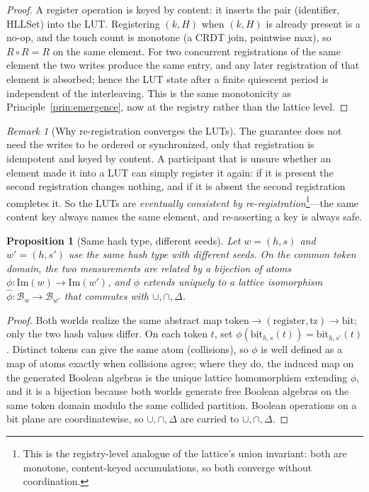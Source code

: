 \documentclass[11pt,a4paper]{article}
\newtheorem{proposition}[theorem]{Proposition}
\theoremstyle{remark}
\newtheorem{remark}[theorem]{Remark}
\newcommand{\Lat}{\ensuremath{\mathcal{B}}}         %
\newcommand{\Img}{\ensuremath{\mathrm{Im}}}         %
\begin{document}
\begin{proof}
A register operation is keyed by content: it inserts the pair (identifier,
HLLSet) into the LUT. Registering $(k,H)$ when $(k,H)$ is already present is a
no-op, and the touch count is monotone (a CRDT join, pointwise max), so
$R\circ R=R$ on the same element. For two concurrent registrations of the same
element the two writes produce the same entry, and any later registration of
that element is absorbed; hence the LUT state after a finite quiescent period is
independent of the interleaving. This is the same monotonicity as
Principle~\ref{prin:emergence}, now at the registry rather than the lattice
level.
\end{proof}

\begin{remark}[Why re-registration converges the LUTs]
The guarantee does not need the writes to be ordered or synchronized, only that
registration is idempotent and keyed by content. A participant that is unsure
whether an element made it into a LUT can simply register it again: if it is
present the second registration changes nothing, and if it is absent the second
registration completes it. So the LUTs are \emph{eventually consistent by
re-registration}\footnote{This is the registry-level analogue of the lattice's
union invariant: both are monotone, content-keyed accumulations, so both
converge without coordination.}---the same content key always names the same
element, and re-asserting a key is always safe.
\end{remark}

\begin{proposition}[Same hash type, different seeds]
\label{prop:isomorphism}
Let $w=(h,s)$ and $w'=(h,s')$ use the same hash type with different seeds. On
the common token domain, the two measurements are related by a bijection of
atoms $\phi:\Img(w)\to\Img(w')$, and $\phi$ extends uniquely to a lattice
isomorphism $\widehat{\phi}:\Lat_w\to\Lat_{w'}$ that commutes with
$\cup,\cap,\Delta$.
\end{proposition}

\begin{proof}
Both worlds realize the same abstract map
$\text{token}\to(\text{register},\text{tz})\to\text{bit}$; only the two hash
values differ. On each token $t$, set
$\phi(\mathrm{bit}_{h,s}(t))=\mathrm{bit}_{h,s'}(t)$. Distinct tokens can give
the same atom (collisions), so $\phi$ is well defined as a map of atoms exactly
when collisions agree; where they do, the induced map on the generated Boolean
algebras is the unique lattice homomorphism extending $\phi$, and it is a
bijection because both worlds generate free Boolean algebras on the same token
domain modulo the same collided partition. Boolean operations on a bit plane are
coordinatewise, so $\cup,\cap,\Delta$ are carried to $\cup,\cap,\Delta$.
\end{proof}
\end{document}

